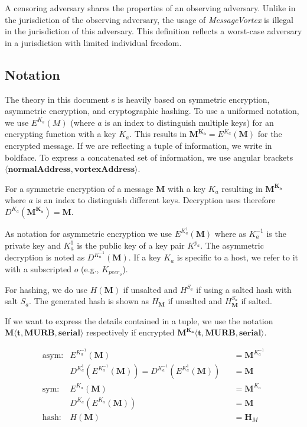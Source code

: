 \documentclass[acmsmall, screen, final]{acmart}
\begin{document}
	A censoring adversary shares the properties of an observing adversary. Unlike in the jurisdiction of the observing adversary, the usage of \emph{MessageVortex} is illegal in the jurisdiction of this adversary. This definition reflects a worst-case adversary in a jurisdiction with limited individual freedom. 
	
	\subsection{Notation \label{sec:encNot}}
	The theory in this document s is heavily based on symmetric encryption, asymmetric encryption, and cryptographic hashing. To use a uniformed notation, we use $E^{K_a}(M)$ (where $a$ is an index to distinguish multiple keys) for an encrypting function with a key $K_a$. This results in $\mathbf{M^{K_a}}=E^{K_a}(\mathbf{M})$ for the encrypted message. If we are reflecting a tuple of information, we write in boldface. To express a concatenated set of information, we use angular brackets $\mathbf{\langle normalAddress,vortexAddress\rangle }$. 
	
	For a symmetric encryption of a message $\mathbf{M}$ with a key $K_a$ resulting in $\mathbf{M^{K_a}}$ where $a$ is an index to distinguish different keys. Decryption uses therefore $D^{K_a}(\mathbf{M^{K_a}})=\mathbf{M}$.
	
	As notation for asymmetric encryption we use $E^{K^{1}_a}(\mathbf{M})$ where as $K^{-1}_a$ is the private key and $K^{1}_a$ is the public key of a key pair $K^{p_a}$. The asymmetric decryption is noted as $D^{K^{-1}_a}(\mathbf{M})$. If a key $K_a$ is specific to a host, we refer to it with a subscripted $o$ (e.g., $K_{peer_o}$).
	
	For hashing, we do use $H(\mathbf{M})$ if unsalted and $H^{S_a}$ if using a salted hash with salt $S_a$. The generated hash is shown as $H_\mathbf{M}$ if unsalted and $H^{S_a}_\mathbf{M}$ if salted.
	
	If we want to express the details contained in a tuple, we use the notation $\mathbf{M\langle t,MURB,serial\rangle}$ respectively if encrypted $\mathbf{M^{K_{a}}\langle t,MURB,serial\rangle}$.
	
	\begin{align*}
	\text{asym:}         & E^{K^{-1}_a}\left(\mathbf{M}\right)                           && =\mathbf{M}^{K^{-1}_a}\\
	& D^{K^{1}_a}\left(E^{K^{-1}_a}\left(\mathbf{M}\right)\right) = D^{K^{-1}_a}\left(E^{K^{1}_a}\left(\mathbf{M}\right)\right)        && =\mathbf{M}\\
	\text{sym:}          & E^{K_a}\left(\mathbf{M}\right)                                && =\mathbf{M}^{K_a}\\
	& D^{K_a}\left(E^{K_a}\left(\mathbf{M}\right)\right)               && =\mathbf{M}\\
	\text{hash:}         & H\left(\mathbf{M}\right)                                      && =\mathbf{H}_M
	\end{align*}
	
\end{document}
